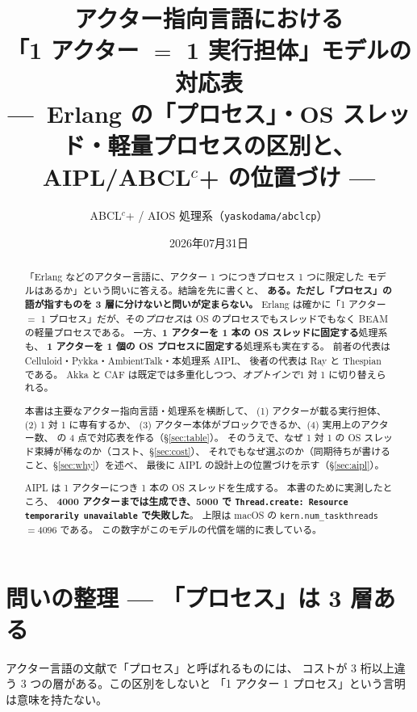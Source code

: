 \documentclass[11pt,a4paper]{ltjsarticle}
\title{アクター指向言語における\\「1 アクター $=$ 1 実行担体」モデルの対応表\\
{\large ---\ Erlang の「プロセス」・OS スレッド・軽量プロセスの区別と、
AIPL/ABCL$^{c}$+ の位置づけ ---}}
\author{ABCL$^{c}$+ / AIOS 処理系（\texttt{yaskodama/abclcp}）}
\date{2026年07月31日}
\begin{document}
\maketitle

\begin{abstract}
「Erlang などのアクター言語に、アクター 1 つにつきプロセス 1 つに限定した
モデルはあるか」という問いに答える。結論を先に書くと、
\textbf{ある。ただし「プロセス」の語が指すものを 3 層に分けないと問いが定まらない。}
Erlang は確かに「1 アクター $=$ 1 プロセス」だが、その\emph{プロセス}は
OS のプロセスでもスレッドでもなく BEAM の軽量プロセスである。
一方、\textbf{1 アクターを 1 本の OS スレッドに固定する}処理系も、
\textbf{1 アクターを 1 個の OS プロセスに固定する}処理系も実在する。
前者の代表は Celluloid・Pykka・AmbientTalk・本処理系 AIPL、
後者の代表は Ray と Thespian である。
Akka と CAF は既定では多重化しつつ、\emph{オプトインで}1 対 1 に切り替えられる。

本書は主要なアクター指向言語・処理系を横断して、
(1) アクターが載る実行担体、(2) 1 対 1 に専有するか、
(3) アクター本体がブロックできるか、(4) 実用上のアクター数、
の 4 点で対応表を作る（\S\ref{sec:table}）。
そのうえで、なぜ 1 対 1 の OS スレッド束縛が稀なのか（コスト、\S\ref{sec:cost}）、
それでもなぜ選ぶのか（同期待ちが書けること、\S\ref{sec:why}）を述べ、
最後に AIPL の設計上の位置づけを示す（\S\ref{sec:aipl}）。

AIPL は 1 アクターにつき 1 本の OS スレッドを生成する。
本書のために実測したところ、
\textbf{4000 アクターまでは生成でき、5000 で \texttt{Thread.create:
Resource temporarily unavailable} で失敗した}。
上限は macOS の \texttt{kern.num\_taskthreads} $=4096$ である。
この数字がこのモデルの代償を端的に表している。
\end{abstract}

\tableofcontents

\section{問いの整理 --- 「プロセス」は 3 層ある}

アクター言語の文献で「プロセス」と呼ばれるものには、
コストが 3 桁以上違う 3 つの層がある。この区別をしないと
「1 アクター 1 プロセス」という言明は意味を持たない。
\end{document}
